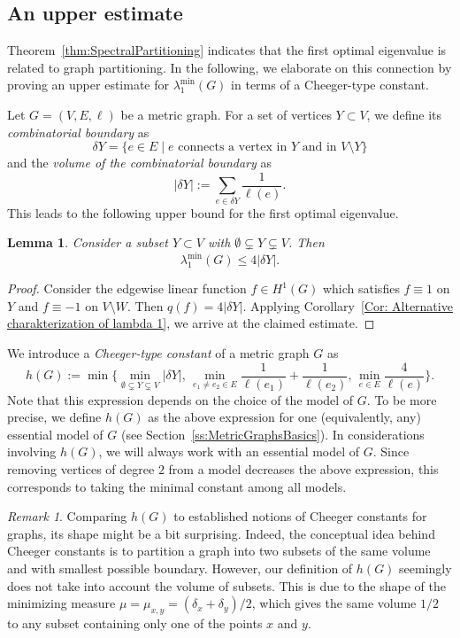 \documentclass[reqno]{amsart}
\theoremstyle{plain}
\newtheorem{lem}[thm]{Lemma}
\theoremstyle{definition}
\theoremstyle{remark}
\newtheorem{rmk}[thm]{Remark}
\numberwithin{equation}{section}
\begin{document}
\subsection{An upper estimate} Theorem~\ref{thm:SpectralPartitioning} indicates that the first optimal eigenvalue is related to graph partitioning. In the following, we elaborate on this connection by proving an upper estimate for $\lambda_1^{\min}(G)$ in terms of a Cheeger-type constant.


Let $G= (V,E,\ell)$ be a metric graph. For a set of vertices $Y \subset V$, we define its \emph{combinatorial boundary} as
\[
\delta Y = \{e \in E \; | \; e \text{ connects a vertex in } Y \text{ and in }V\setminus Y\}
\] 
and the \emph{volume of the combinatorial boundary} as 
\[
| \delta Y | := \sum_{e \in \delta Y} \frac{1}{\ell(e)}. 
\]
This leads to the following upper bound for the first optimal eigenvalue.
\begin{lem} \label{lem:BasicCheeger}
	Consider a subset $Y \subset V$ with $\emptyset\subsetneq  Y \subsetneq V$. Then 
	\[
	\lambda_{1}^{\min}(G) \leq 4|\delta Y|. 
	\]
\end{lem}
\begin{proof}
	Consider the edgewise linear function $f \in H^1(G)$ which satisfies  $f \equiv 1$ on $Y$ and $f \equiv -1$ on $V \setminus W$. Then $q(f) = 4|\delta Y|$. Applying Corollary~\ref{Cor: Alternative charakterization of lambda 1}, we arrive at the claimed estimate.
\end{proof}

We introduce a \emph{Cheeger-type constant} of a metric graph $G$ as
\[
h(G) := \min \Big \{ \min_{\emptyset \subsetneq  Y \subsetneq V} | \delta Y|, \, \min_{e_1\neq e_2 \in E} \frac{1}{\ell (e_1)} + \frac{1}{\ell(e_2)}, \, \min_{e \in E} \frac{4}{\ell(e)} \Big \}.
\] 
Note that this expression depends on the choice of the model of $G$. To be more precise, we define $h(G)$ as the above expression for one (equivalently, any) essential model of $G$ (see Section~\ref{ss:MetricGraphsBasics}). In considerations involving $h(G)$, we will always work with an essential model of $G$. Since removing vertices of degree $2$ from a model decreases the above expression, this corresponds to taking the minimal constant among all models.


\begin{rmk}
	Comparing $h(G)$ to established notions of Cheeger constants for graphs, its shape might be a bit surprising. Indeed, the conceptual idea behind Cheeger constants is to partition a graph into two subsets of the same volume and with smallest possible boundary. However, our definition of $h(G)$ seemingly does not take into account the volume of subsets. This is due to the shape of the minimizing measure $\mu = \mu_{x,y} = (\delta_x + \delta_y)/2$, which gives the same volume $1/2$ to any subset containing only one of the points $x$ and $y$.
\end{rmk}
\end{document}

